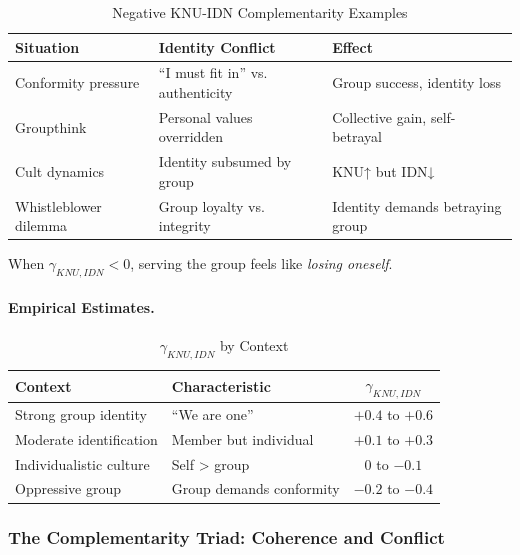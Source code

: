 \begin{table}[htbp]
\centering
\caption{Negative KNU-IDN Complementarity Examples}
\label{tab:knu-idn-negative}
\renewcommand{\arraystretch}{1.3}
\begin{tabular}{@{}lll@{}}
\toprule
\textbf{Situation} & \textbf{Identity Conflict} & \textbf{Effect} \\
\midrule
Conformity pressure & ``I must fit in'' vs. authenticity & Group success, identity loss \\
Groupthink & Personal values overridden & Collective gain, self-betrayal \\
Cult dynamics & Identity subsumed by group & KNU↑ but IDN↓ \\
Whistleblower dilemma & Group loyalty vs. integrity & Identity demands betraying group \\
\bottomrule
\end{tabular}
\end{table}

When $\gamma_{KNU,IDN} < 0$, serving the group feels like \emph{losing oneself}.

\paragraph{Empirical Estimates.}

\begin{table}[htbp]
\centering
\caption{$\gamma_{KNU,IDN}$ by Context}
\label{tab:gamma-knu-idn-context}
\renewcommand{\arraystretch}{1.3}
\begin{tabular}{@{}llc@{}}
\toprule
\textbf{Context} & \textbf{Characteristic} & $\gamma_{KNU,IDN}$ \\
\midrule
Strong group identity & ``We are one'' & $+0.4$ to $+0.6$ \\
Moderate identification & Member but individual & $+0.1$ to $+0.3$ \\
Individualistic culture & Self > group & $0$ to $-0.1$ \\
Oppressive group & Group demands conformity & $-0.2$ to $-0.4$ \\
\bottomrule
\end{tabular}
\end{table}

\subsubsection{The Complementarity Triad: Coherence and Conflict}

